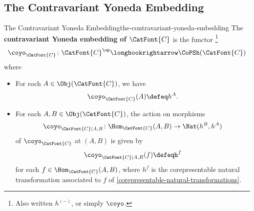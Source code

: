 \subsection{The Contravariant Yoneda Embedding}\label{subsection-the-contravariant-yoneda-embedding}
\begin{definition}{The Contravariant Yoneda Embedding}{the-contravariant-yoneda-embedding}%
    The \textbf{contravariant Yoneda embedding of $\CatFont{C}$} is the functor%
    \footnote{%
        Also written $h^{(-)}$, or simply $\coyo$.
        \par\vspace*{-1.75\baselineskip}
    } %
    \[
        \coyo_{\CatFont{C}}%
        \colon%
        \CatFont{C}^{\op}%
        \longhookrightarrow%
        \CoPSh(\CatFont{C})%
    \]%
    where
    \begin{itemize}
        \item{}For each $A\in\Obj(\CatFont{C})$, we have
            \[
                \coyo_{\CatFont{C}}(A)
                \defeq
                h^{A}.
            \]%
        \item{}For each $A,B\in\Obj(\CatFont{C})$, the action on morphisms
            \[
                \coyo_{\CatFont{C}|A,B}%
                \colon%
                \Hom_{\CatFont{C}}(A,B)%
                \to%
                \Nat(h^{B},h^{A})%
            \]%
            of $\coyo_{\CatFont{C}}$ at $(A,B)$ is given by
            \[
                \coyo_{\CatFont{C}|A,B}(f)%
                \defeq%
                h^{f}%
            \]%
            for each $f\in\Hom_{\CatFont{C}}(A,B)$, where $h^{f}$ is the corepresentable natural transformation associated to $f$ of \cref{corepresentable-natural-transformations}.
    \end{itemize}
\end{definition}
